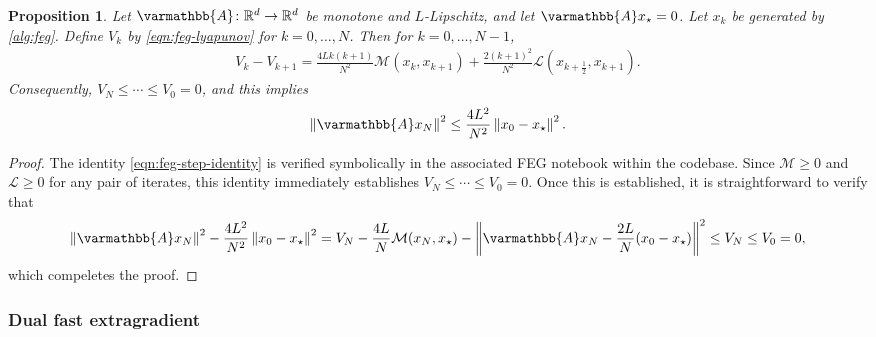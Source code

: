 \documentclass{article}
\theoremstyle{definition}
\theoremstyle{plain}
\newtheorem{proposition}{Proposition}
\newcommand{\cL}{{\mathcal{L}}}
\newcommand{\cM}{{\mathcal{M}}}
\newcommand{\reals}{\mathbb{R}}
\newcommand{\opA}{{\varmathbb{A}}}
\newcommand{\sqnorm}[1]{\left\| #1 \right\|^2}
\begin{document}
\begin{proposition}
\label{proposition:feg}
Let $\opA\colon\reals^d\to\reals^d$ be monotone and $L$-Lipschitz, and let $\opA x_\star=0$.
Let $x_k$ be generated by \eqref{alg:feg}.
Define $V_k$ by \eqref{eqn:feg-lyapunov} for $k=0,\dots,N$. Then for $k=0,\dots,N-1$,
\begin{align}
\label{eqn:feg-step-identity}
    V_k-V_{k+1}
    =
    \frac{4Lk(k+1)}{N^2}\cM(x_k,x_{k+1})
    +\frac{2(k+1)^2}{N^2}\cL(x_{k+\frac12},x_{k+1}).
\end{align}
Consequently, $V_N\le \cdots \le V_0=0$, and this implies
\[
    \sqnorm{\opA x_N}\le\frac{4L^2}{N^2}\sqnorm{x_0-x_\star}.
\]
\end{proposition}

\begin{proof}
The identity \eqref{eqn:feg-step-identity} is verified symbolically in the associated FEG notebook  within the codebase.
Since $\cM\ge0$ and $\cL\ge0$ for any pair of iterates, this identity immediately establishes $V_N\le \cdots \le V_0=0$.
Once this is established, it is straightforward to verify that
\begin{align*}
    \sqnorm{\opA x_N}
    -\frac{4L^2}{N^2}\sqnorm{x_0-x_\star}
    =
    V_N-\frac{4L}{N}\cM(x_N,x_\star)
    -\sqnorm{\opA x_N-\frac{2L}{N}(x_0-x_\star)} \le V_N \le V_0 = 0 ,
\end{align*}
which compeletes the proof.
\end{proof}

\subsubsection{Dual fast extragradient}
\label{section:dual-feg}
\end{document}

